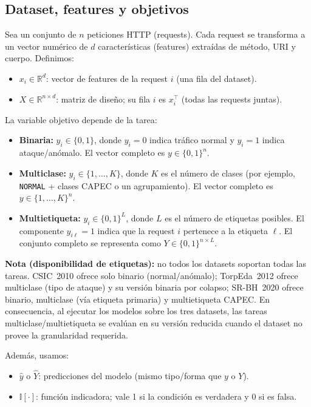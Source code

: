 \documentclass[12pt,oneside]{report}
\newcommand{\R}{\mathbb{R}}
\newcommand{\ind}{\mathbb{I}} %
\begin{document}
\subsection{Dataset, features y objetivos}
Sea un conjunto de $n$ peticiones HTTP (requests). Cada request se transforma a un vector numérico de $d$ características (features)
extraídas de método, URI y cuerpo. Definimos:

\begin{itemize}[leftmargin=*]
  \item $x_i \in \R^d$: vector de features de la request $i$ (una fila del dataset).
  \item $X \in \R^{n \times d}$: matriz de diseño; su fila $i$ es $x_i^\top$ (todas las requests juntas).
\end{itemize}

La variable objetivo depende de la tarea:

\begin{itemize}[leftmargin=*]
  \item \textbf{Binaria:} $y_i \in \{0,1\}$, donde $y_i=0$ indica tráfico normal y $y_i=1$ indica ataque/anómalo.
        El vector completo es $y \in \{0,1\}^n$.
  \item \textbf{Multiclase:} $y_i \in \{1,\dots,K\}$, donde $K$ es el número de clases (por ejemplo, \texttt{NORMAL} + clases CAPEC o un agrupamiento).
        El vector completo es $y \in \{1,\dots,K\}^n$.
  \item \textbf{Multietiqueta:} $y_i \in \{0,1\}^L$, donde $L$ es el número de etiquetas posibles.
        El componente $y_{i\ell}=1$ indica que la request $i$ pertenece a la etiqueta $\ell$.
        El conjunto completo se representa como $Y \in \{0,1\}^{n \times L}$.
\end{itemize}

\noindent\textbf{Nota (disponibilidad de etiquetas):} no todos los datasets soportan todas las tareas. CSIC~2010 ofrece solo binario (normal/anómalo); TorpEda~2012 ofrece multiclase (tipo de ataque) y su versión binaria por colapso; SR-BH~2020 ofrece binario, multiclase (vía etiqueta primaria) y multietiqueta CAPEC. En consecuencia, al ejecutar los modelos sobre los tres datasets, las tareas multiclase/multietiqueta se evalúan en su versión reducida cuando el dataset no provee la granularidad requerida.

Además, usamos:

\begin{itemize}[leftmargin=*]
  \item $\hat{y}$ o $\hat{Y}$: predicciones del modelo (mismo tipo/forma que $y$ o $Y$).
  \item $\ind[\cdot]$: función indicadora; vale 1 si la condición es verdadera y 0 si es falsa.
\end{itemize}
\end{document}
